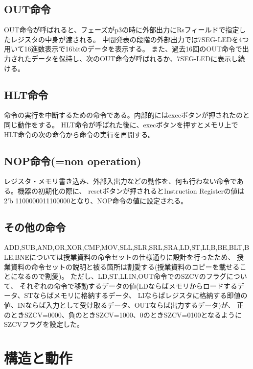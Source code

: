 \documentclass[a4j,titlepage]{jarticle}
\begin{document}
\subsection{OUT命令}
OUT命令が呼ばれると、フェーズがp3の時に外部出力にRsフィールドで指定したレジスタの中身が渡される。
中間発表の段階の外部出力では7SEG-LEDを4つ用いて16進数表示で16bitのデータを表示する。
また、過去16回のOUT命令で出力されたデータを保持し、次のOUT命令が呼ばれるか、7SEG-LEDに表示し続ける。

\subsection{HLT命令}
命令の実行を中断するための命令である。内部的にはexecボタンが押されたのと同じ動作をする。
HLT命令が呼ばれた後に、execボタンを押すとメモリ上でHLT命令の次の命令から命令の実行を再開する。

\subsection{NOP命令(=non operation)}
レジスタ・メモリ書き込み、外部入出力などの動作を、何も行わない命令である。機器の初期化の際に、
resetボタンが押されるとInstruction Registerの値は2'b 1100000011100000となり、NOP命令の値に設定される。

\subsection{その他の命令}
ADD,SUB,AND,OR,XOR,CMP,MOV,SLL,SLR,SRL,SRA,LD,ST,LI,B,BE,BLT,BLE,BNEについては授業資料の命令セットの仕様通りに設計を行ったため、
授業資料の命令セットの説明と被る箇所は割愛する(授業資料のコピーを載せることになるので割愛)。
ただし、LD,ST,LI,IN,OUT命令でのSZCVのフラグについて、
それぞれの命令で移動するデータの値(LDならばメモリからロードするデータ、STならばメモリに格納するデータ、
LIならばレジスタに格納する即値の値、INならば入力として受け取るデータ、OUTならば出力するデータ)が、
正のときSZCV=0000、負のときSZCV=1000、0のときSZCV=0100となるようにSZCVフラグを設定した。


\section{構造と動作}
\end{document}
